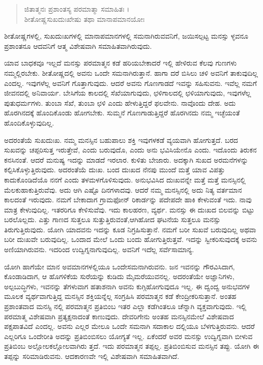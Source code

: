 \begin{verse}
ಜಿತಾತ್ಮನಃ ಪ್ರಶಾಂತಸ್ಯ ಪರಮಾತ್ಮಾ ಸಮಾಹಿತಃ ।\\ಶೀತೋಷ್ಣಸುಖದುಃಖೇಷು ತಥಾ ಮಾನಾಪಮಾನಯೋಃ 
\end{verse}

{\small ಶೀತೋಷ್ಣಗಳಲ್ಲಿ, ಸುಖದುಃಖಗಳಲ್ಲಿ ಮಾನಾಪಮಾನಗಳಲ್ಲಿ ಸಮನಾಗಿರುವವನಿಗೆ, ಜಯಿಸಲ್ಪಟ್ಟ ಮನಸ್ಸು ಳ್ಳವನೂ ಪ್ರಶಾಂತನೂ ಆದವನಿಗೆ ಆತ್ಮ ವಿಶೇಷವಾಗಿ ಸಮಾಹಿತವಾಗಿರುವುದು.}

ಯಾವ ಬಾಧಕವೂ ಇಲ್ಲದೆ ಮನಸ್ಸು ಪರಮಾತ್ಮನ ಕಡೆ ಹರಿಯಬೇಕಾದರೆ ಇಲ್ಲಿ ಹೇಳಿರುವ ಕೆಲವು ಗುಣಗಳು ನಮ್ಮಲ್ಲಿರಬೇಕು. ಶೀತೋಷ್ಣದಲ್ಲಿ ಅವನು ಒಂದೇ ಸಮನಾಗಿರುತ್ತಾನೆ. ಹಾಗಾ ದರೆ ಬಿಸಿಲು ಚಳಿ ಅವನಿಗೆ ತಾಕುವುದಿಲ್ಲ ಎಂದಲ್ಲ. ಇವುಗಳೆಲ್ಲ ಅವನಿಗೆ ಗೊತ್ತಾಗುವುದು. ಆದರೆ ಅವನು ಗೊಣಗಾಡದೆ ಇವನ್ನು ಸಹಿಸುವನು. ಇವೆಲ್ಲ ನಮಗೆ ಜೀವನದಲ್ಲಿ ಅನಿವಾರ್ಯ. ಬೇಸಿಗೆಯ ಕಾಲದಲ್ಲಿ ಸೆಖೆಯಾಗುವುದು, ಛಳಿಗಾಲದಲ್ಲಿ ಛಳಿಯಾಗುವುದು, ಇವುಗಳೆಲ್ಲ ಪುತುಧರ್ಮಗಳು. ತುಂಬಾ ಸೆಖೆ, ತುಂಬಾ ಛಳಿ ಎಂದು ಹೇಳುತ್ತಿದ್ದರೆ ಫಲವೇನು. ನಾವೊಂದು ದೇಹ. ಅದು ಹೊರಗಿನದಕ್ಕೆ ಹೊಂದಿಕೊಂಡು ಹೋಗಬೇಕು. ಸುಮ್ಮನೆ ಗೊಣಗಾಡುತ್ತಿದ್ದರೆ ಹೊರಗಿನದು ನಮ್ಮ ಇಚ್ಛೆಯಂತೆ ಹೊಂದಿಕೊಳ್ಳುವುದಿಲ್ಲ.

ಅದರಂತೆಯೆ ಸುಖದುಃಖ. ನಮ್ಮ ಮನಸ್ಸಿನ ಬಹುಪಾಲು ಶಕ್ತಿ ಇವುಗಳಕಡೆ ವ್ಯಯವಾಗಿ ಹೋಗುತ್ತದೆ. ಬರದ ಸುಖವನ್ನು ಚಪ್ಪರಿಸುತ್ತ ಇರುತ್ತೇವೆ, ಎಂದು ಬರುವುದೊ, ಎಂದು ಅನು ಭವಿಸಿಯೇನೊ ಎಂದು. ಇದೊಂದು ತಿರುಕನ ಕನಸಿನಂತೆ. ಆದರೆ ಮನುಷ್ಯ ಇದನ್ನು ಮಾಡದೆ ಇರಲಾರ. ಕುಳಿತು ಬೇಜಾರು. ಅದಕ್ಕಾಗಿ ಸುಖದ ಅರಮನೆಗಳನ್ನು ಕಲ್ಪಿಸಿಕೊಳ್ಳುತ್ತಿರುವುದು. ಅದರಂತೆಯೆ ದುಃಖ. ಬಂದ ದುಃಖದ ನೆನಪು ಮುಂದೆ ಮತ್ತೆ ಯಾವ ವಿಪತ್ತು ಕಾದುಕೊಂಡಿದೆಯೊ ನನಗೆ ಎಂದು ತಳಮಳಗೊಳಿಸುವುದು. ಅನುಭವಿಸಿದ ದುಃಖವನ್ನೇ ಮತ್ತೆ ಮತ್ತೆ ಮನಸ್ಸಿನಲ್ಲಿ ಮೆಲಕುಹಾಕುತ್ತಿರುವೆವು. ಅದು ಆಗಿ ಎಷ್ಟೊ ದಿನಗಳಾದವು. ಆದರೆ ನಮ್ಮ ಮನಸ್ಸಿನಲ್ಲಿ ಅದು ನಿತ್ಯ ವರ್ತಮಾನ ಕಾಲದಂತೆ ಇರುವುದು. ನಮಗೆ ಬೇಕಾದಾಗ ಗ್ರಾಮಫೋನ್ ರಿಕಾರ್ಡನ್ನು ಪದೇಪದೇ ಹಾಕಿ ಕೇಳುವಂತೆ ಇದು. ನಾವು ಮಾತ್ರ ಕೇಳುವುದಿಲ್ಲ. ಇತರರಿಗೂ ಕೇಳಿಸುವೆವು. ಇದು ಕಾಲಹರಣ, ವ್ಯರ್ಥ. ಮನಸ್ಸು ಈ ದುಃಖದ ಬಿಲವನ್ನು ಬಿಟ್ಟು ಬರಲೊಲ್ಲದು. ಎತ್ತು ಗಾಣದ ಸುತ್ತಲೂ ಸುತ್ತುತ್ತಿರುವಂತೆ,ಆಗಿಹೋದ ಘಟನೆಯ ಸುತ್ತಲೂ ಮನಸ್ಸು ತಿರುಗುತ್ತಿರುವುದು. ಯೋಗಿ ಯಾದವನು ಇದನ್ನು ಕೂಡ ನಿಗ್ರಹಿಸುತ್ತಾನೆ. ನಮಗೆ ಬರೀ ಸುಖವೆ ಬರುವುದಿಲ್ಲ ಅಥವಾ ಬರೀ ದುಃಖವೇ ಬರುವುದಿಲ್ಲ. ಒಂದಾದ ಮೇಲೆ ಒಂದು ಬಂದು ಹೋಗುತ್ತಿರುತ್ತವೆ. ಇದನ್ನು ಸ್ವೀಕರಿಸುವುದಕ್ಕೆ ಅವನು ಅಣಿಯಾಗಿರುವನು. ಇದರಿಂದ ಉದ್ವಿಗ್ನನಾಗುವುದಿಲ್ಲ. ಅವನಿಗೆ ಇದೆಲ್ಲ ಸರ್ವೆಸಾಮಾನ್ಯ.

ಯೋಗಿ ಹಾಗೆಯೇ ಮಾನ ಅವಮಾನಗಳಲ್ಲಿಯೂ ಒಂದೇಸಮನಾಗಿರುವನು. ಜನ ಇವನನ್ನು ಗೌರವಿಸಿದಾಗ, ಕೊಂಡಾಡಿದಾಗ, ಆ ಹೊಗಳಿಕೆಯ ಸುರೆಯನ್ನು ಕುಡಿದು ಮೈಮರೆಯುವನಲ್ಲ. ಅದರಂತೆಯೇ ಅಜ್ಞಾನಿಗಳು, ಅಲ್ಪಬುದ್ಧಿಗಳು, ಇವನನ್ನು ತೆಗಳುವಾಗ ಹತಾಶನಾಗಿ ಅವನು ಕುಗ್ಗಿಹೋಗುವುದೂ ಇಲ್ಲ. ಈ ದ್ವಂದ್ವ ಅನುಭವಗಳ ಮೂಲಕ ವ್ಯರ್ಥವಾಗುತ್ತಿದ್ದ ಮನಸ್ಸಿನ ಶಕ್ತಿಯನ್ನೆಲ್ಲ ಸಂಗ್ರಹಿಸಿ ಪರಮಾತ್ಮನ ಕಡೆ ಕೇಂದ್ರೀಕರಿಸುತ್ತಾನೆ. ಅಂತಹ ಪ್ರಶಾಂತವಾದ ಮನಸ್ಸಿ ನಲ್ಲಿ ಪರಮಾತ್ಮನ ಪ್ರತಿಬಿಂಬ ಇತರ ಎಲ್ಲಾ ಕಡೆಗಿಂತಲೂ ಚೆನ್ನಾಗಿ ವ್ಯಕ್ತವಾಗುವುದು. ಇಲ್ಲಿ ಪರಮಾತ್ಮ ವಿಶೇಷವಾಗಿ ಪ್ರತ್ಯಕ್ಷನಾದಂತೆ ಕಾಣುವುದು. ದೇವರಿಗೇನು ಅಂತಹ ಮನಸ್ಸಿನಮೇಲೆ ವಿಶೇಷವಾದ ಪಕ್ಷಪಾತವಿದೆ ಎಂದಲ್ಲ. ಅವನು ಎಲ್ಲರ ಮೇಲೂ ಒಂದೇ ಸಮನಾಗಿ ಸದಾಕಾಲ ದಲ್ಲಿಯೂ ಬೆಳಗುತ್ತಿರುವನು. ಆದರೆ ಎಲ್ಲರಿಗೂ ಒಂದೇರೀತಿ ಅದನ್ನು ಪ್ರತಿಬಿಂಬಿಸಲು ಯೋಗ್ಯತೆ ಇಲ್ಲ. ಏಕೆಂದರೆ ಅವರ ಮನಸ್ಸು ಉದ್ವಿಗ್ನವಾಗಿ ಬೀಳುವ ಪ್ರತಿಬಿಂಬ ಅಲ್ಲೋಲಕಲ್ಲೋಲವಾಗಿರು ತ್ತದೆ. ಇದು ಪರಮಾತ್ಮನ ತಪ್ಪಲ್ಲ. ಪ್ರತಿಬಿಂಬಿಸುವ ಮನಸ್ಸಿನ ತಪ್ಪು. ಯೋಗಿ ಈ ತಪ್ಪನ್ನು ಸರಿಮಾಡಿರುವನು. ಆದಕಾರಣವೇ ಇಲ್ಲಿ ವಿಶೇಷವಾಗಿ ಸಮಾಹಿತವಾಗಿದೆ.

